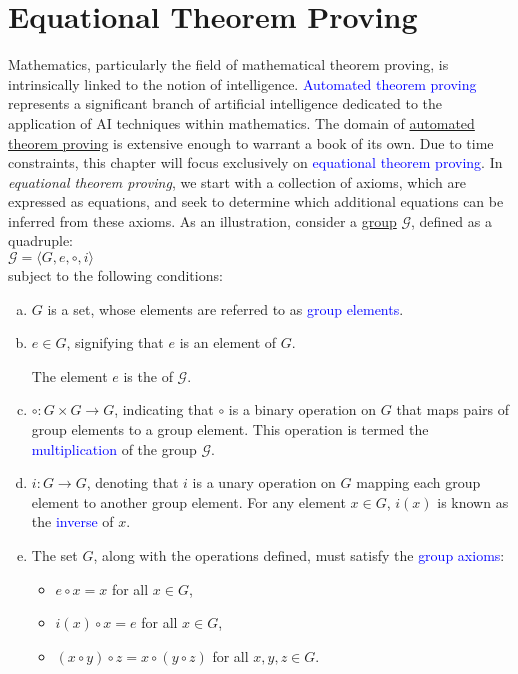 \chapter{Equational Theorem Proving}
Mathematics, particularly the field of mathematical theorem proving, is intrinsically linked to the notion of
intelligence. \textcolor{blue}{Automated theorem proving} represents a significant branch of artificial
intelligence dedicated to the application of AI techniques within mathematics. The domain of
\href{https://en.wikipedia.org/wiki/Automated_theorem_proving}{automated theorem proving} is extensive enough
to warrant a book of its own.  Due to time constraints, this chapter will focus exclusively on
\textcolor{blue}{equational theorem proving}.  In \emph{equational theorem proving}, we start with a collection
of axioms, which are expressed as equations, and seek to determine which additional equations can be inferred
from these axioms. As an illustration, consider a \href{https://en.wikipedia.org/wiki/Group_(mathematics)}{group}
$\mathcal{G}$, defined as a quadruple:  
\\[0.2cm]
\hspace*{1.3cm}
$\mathcal{G} = \langle G, e, \circ, i \rangle$
\\[0.2cm]
subject to the following conditions:
\begin{enumerate}[(a)]
    \item $G$ is a set, whose elements are referred to as \textcolor{blue}{group elements}.
    \item $e \in G$, signifying that $e$ is an element of $G$.

          The element $e$ is the  of $\mathcal{G}$.
    \item $\circ: G \times G \rightarrow G$, indicating that $\circ$ is a binary operation on $G$ that maps
          pairs of group elements to a group element. This operation is termed the \textcolor{blue}{multiplication}
          of the group $\mathcal{G}$. 
    \item $i: G \rightarrow G$, denoting that $i$ is a unary operation on $G$ mapping each group element to
          another group element. For any element $x \in G$, $i(x)$ is known as the
          \textcolor{blue}{inverse} of $x$. 
    \item The set $G$, along with the operations defined, must satisfy the \textcolor{blue}{group axioms}:  
      \begin{itemize}
          \item $e \circ x = x$ for all $x \in G$,
          \item $i(x) \circ x = e$ for all $x \in G$,
          \item $(x \circ y) \circ z = x \circ (y \circ z)$ for all $x, y, z \in G$.
      \end{itemize}
\end{enumerate}
